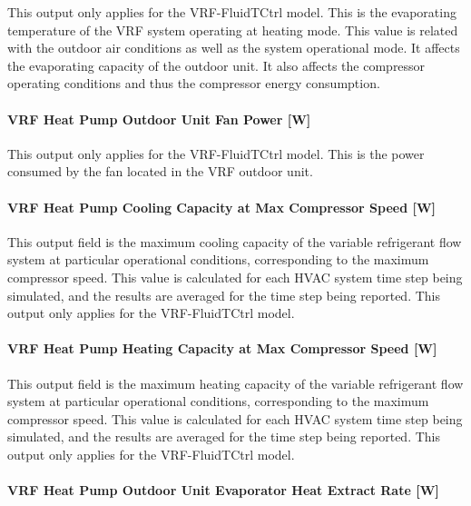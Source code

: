 This output only applies for the VRF-FluidTCtrl model. This is the evaporating temperature of the VRF system operating at heating mode. This value is related with the outdoor air conditions as well as the system operational mode. It affects the evaporating capacity of the outdoor unit. It also affects the compressor operating conditions and thus the compressor energy consumption.

\paragraph{VRF Heat Pump Outdoor Unit Fan Power {[}W{]}}\label{vrf-heat-pump-outdoor-unit-fan-power-w}

This output only applies for the VRF-FluidTCtrl model. This is the power consumed by the fan located in the VRF outdoor unit.

\paragraph{VRF Heat Pump Cooling Capacity at Max Compressor Speed {[}W{]}}\label{vrf-heat-pump-cooling-capacity-at-max-compressor-speed}

This output field is the maximum cooling capacity of the variable refrigerant flow system at particular operational conditions, corresponding to the maximum compressor speed. This value is calculated for each HVAC system time step being simulated, and the results are averaged for the time step being reported. This output only applies for the VRF-FluidTCtrl model.

\paragraph{VRF Heat Pump Heating Capacity at Max Compressor Speed {[}W{]}}\label{vrf-heat-pump-heating-capacity-at-max-compressor-speed}

This output field is the maximum heating capacity of the variable refrigerant flow system at particular operational conditions, corresponding to the maximum compressor speed. This value is calculated for each HVAC system time step being simulated, and the results are averaged for the time step being reported. This output only applies for the VRF-FluidTCtrl model.

\paragraph{VRF Heat Pump Outdoor Unit Evaporator Heat Extract Rate {[}W{]}}\label{vrf-heat-pump-outdoor-unit-evaporator-heat-extract-rate}

